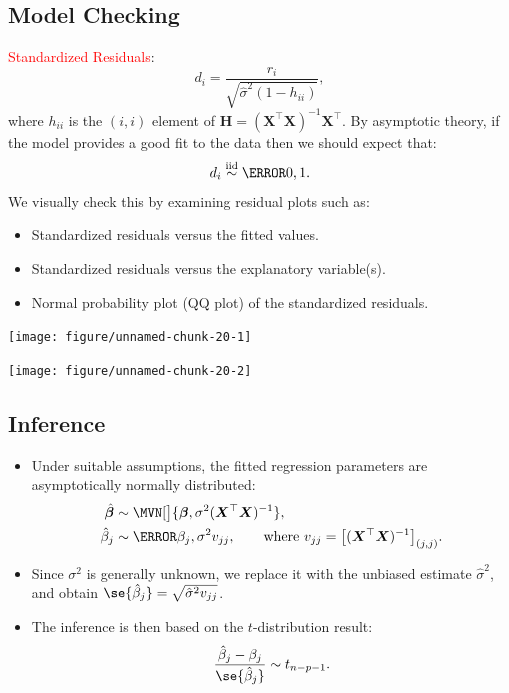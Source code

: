 \documentclass{article}\usepackage[]{graphicx}\usepackage[svgnames]{xcolor}
\newenvironment{knitrout}{}{} %
\newcommand*\circled[1]{\tikz[baseline=(char.base)]{\node[shape=circle,draw,inner sep=2pt] (char) {#1};}}
\newcommand{\iid}{\overset{\text{iid}}{\sim}}%
\providecommand{\Vector}[1]{\bm{#1}}%
\providecommand{\Matrix}[1]{\bm{#1}}
\begin{document}
\subsection*{\circled{3} Model Checking}
\textcolor{Red}{Standardized Residuals}:
\[ d_i=\frac{r_i}{\sqrt{\hat{\sigma}^2(1-h_{ii})}},  \]
where $ h_{ii} $ is the $ (i,i) $ element of $ \Matrix{H}=(\Matrix{X}^\top\Matrix{X})^{-1}\Matrix{X}^\top $.
By asymptotic theory, if the model provides a good fit to the data then we
should expect that:
\[ d_i\iid \N{0,1}. \]
We visually check this by examining residual plots such as:
\begin{itemize}
      \item Standardized residuals versus the fitted values.
      \item Standardized residuals versus the explanatory variable(s).
      \item Normal probability plot (QQ plot) of the standardized residuals.
\end{itemize}
\begin{knitrout}
\color{fgcolor}

{\centering \texttt{[image: figure/unnamed-chunk-20-1]} 

}




{\centering \texttt{[image: figure/unnamed-chunk-20-2]} 

}


\end{knitrout}

\subsection*{\circled{4} Inference}
\begin{itemize}
      \item Under suitable assumptions, the fitted regression parameters are asymptotically
            normally distributed:
            \begin{align*}
                  \hat{\Vector{\beta}} & \sim \MVN[\big]{\Vector{\beta},\sigma^2(\Matrix{X}^\top \Matrix{X})^{-1}},                                        \\
                  \hat{\beta}_j        & \sim \N{\beta_j,\sigma^2v_{jj}},\qquad\text{where $v_{jj}=\bigl[(\Matrix{X}^\top\Matrix{X})^{-1}\bigr]_{(j,j)}$}.
            \end{align*}
      \item Since $ \sigma^2 $ is generally unknown, we replace it with the unbiased estimate $ \hat{\sigma}^2 $, and obtain $ \se{\hat{\beta}_j}=\sqrt{\hat{\sigma}^2v_{jj}} $.
      \item The inference is then based on the $t$-distribution result:
            \[ \frac{\hat{\beta}_j-\beta_j}{\se{\hat{\beta}_j}}\sim t_{n-p-1}.  \]
\end{itemize}
\end{document}
